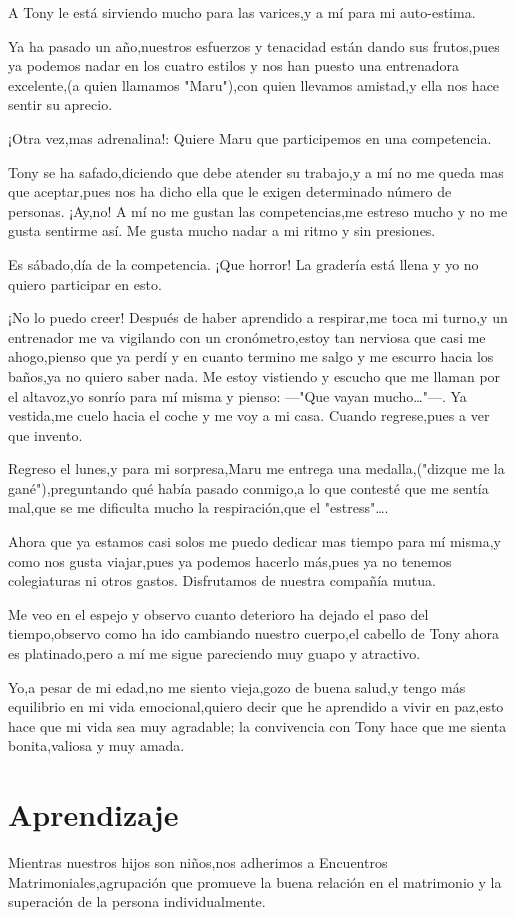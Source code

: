 \documentclass[letterpaper,12pt]{book}
\begin{document}
A Tony le está sirviendo mucho para las varices,y a mí para mi auto-estima.

Ya ha pasado un año,nuestros esfuerzos y tenacidad están dando sus frutos,pues ya podemos nadar en los cuatro estilos y nos han puesto una entrenadora excelente,(a quien llamamos "Maru"),con quien llevamos amistad,y ella nos hace sentir su aprecio.

¡Otra vez,mas adrenalina!: Quiere Maru que participemos en una competencia.

Tony se ha safado,diciendo que debe atender su trabajo,y a mí no me queda mas que aceptar,pues nos ha dicho ella que le exigen determinado número de personas. ¡Ay,no! A mí no me gustan las competencias,me estreso mucho y no me gusta sentirme así. Me gusta mucho nadar a mi ritmo y sin presiones.

Es sábado,día de la competencia. ¡Que horror! La gradería está llena y yo no quiero participar en esto. 

¡No lo puedo creer! Después de haber aprendido a respirar,me toca mi turno,y un entrenador me va vigilando con un cronómetro,estoy tan nerviosa que casi me ahogo,pienso que ya perdí y en cuanto termino me salgo y me escurro hacia los baños,ya no quiero saber nada. Me estoy vistiendo y escucho que me llaman por el altavoz,yo  sonrío para mí misma y pienso: ---"Que vayan mucho\ldots"---.  Ya vestida,me cuelo hacia el coche y me voy a mi casa. Cuando regrese,pues a ver que invento.

Regreso el lunes,y para mi sorpresa,Maru me entrega una medalla,("dizque me la gané"),preguntando qué había pasado conmigo,a lo que contesté que me sentía mal,que se me dificulta mucho la respiración,que el "estress"\ldots.

Ahora que ya estamos casi solos me puedo dedicar mas tiempo para mí misma,y como nos gusta viajar,pues ya podemos hacerlo más,pues ya no tenemos colegiaturas ni otros gastos. Disfrutamos de nuestra compañía mutua.

Me veo en el espejo y observo cuanto deterioro ha dejado el paso del tiempo,observo como ha ido cambiando nuestro cuerpo,el cabello de Tony ahora es platinado,pero a mí me sigue pareciendo muy guapo y atractivo.

Yo,a pesar de mi edad,no me siento vieja,gozo de buena salud,y tengo más equilibrio en mi vida emocional,quiero decir que he aprendido a vivir en paz,esto hace que mi vida sea muy agradable; la convivencia con Tony hace que me sienta bonita,valiosa y muy amada.
\chapter{Aprendizaje}
Mientras nuestros hijos son niños,nos adherimos a Encuentros Matrimoniales,agrupación que promueve la buena relación en el matrimonio y la superación de la persona individualmente.
\end{document}
